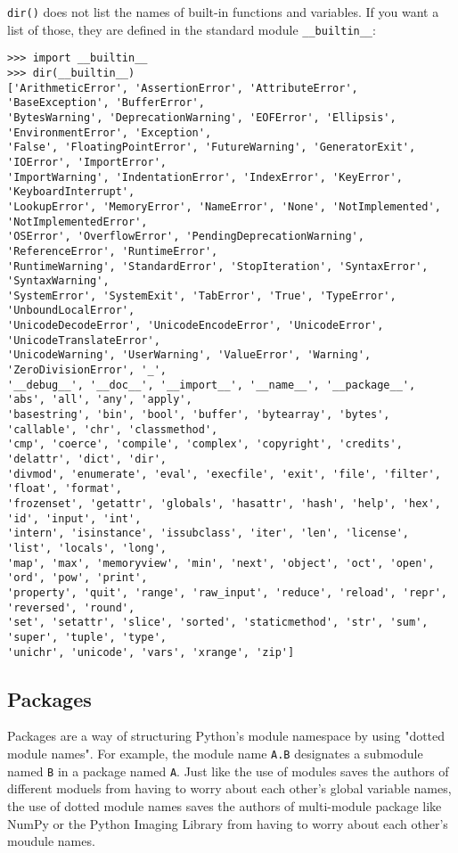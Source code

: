 \documentclass[UTF8]{article}
\begin{document}
\texttt{dir()} does not list the names of built-in functions and variables. If you want a list of
those, they are defined in the standard module \texttt{\_\_builtin\_\_}:
\begin{verbatim}
>>> import __builtin__
>>> dir(__builtin__)
['ArithmeticError', 'AssertionError', 'AttributeError', 'BaseException', 'BufferError',
'BytesWarning', 'DeprecationWarning', 'EOFError', 'Ellipsis', 'EnvironmentError', 'Exception',
'False', 'FloatingPointError', 'FutureWarning', 'GeneratorExit', 'IOError', 'ImportError',
'ImportWarning', 'IndentationError', 'IndexError', 'KeyError', 'KeyboardInterrupt',
'LookupError', 'MemoryError', 'NameError', 'None', 'NotImplemented', 'NotImplementedError',
'OSError', 'OverflowError', 'PendingDeprecationWarning', 'ReferenceError', 'RuntimeError',
'RuntimeWarning', 'StandardError', 'StopIteration', 'SyntaxError', 'SyntaxWarning',
'SystemError', 'SystemExit', 'TabError', 'True', 'TypeError', 'UnboundLocalError',
'UnicodeDecodeError', 'UnicodeEncodeError', 'UnicodeError', 'UnicodeTranslateError',
'UnicodeWarning', 'UserWarning', 'ValueError', 'Warning', 'ZeroDivisionError', '_',
'__debug__', '__doc__', '__import__', '__name__', '__package__', 'abs', 'all', 'any', 'apply',
'basestring', 'bin', 'bool', 'buffer', 'bytearray', 'bytes', 'callable', 'chr', 'classmethod',
'cmp', 'coerce', 'compile', 'complex', 'copyright', 'credits', 'delattr', 'dict', 'dir',
'divmod', 'enumerate', 'eval', 'execfile', 'exit', 'file', 'filter', 'float', 'format',
'frozenset', 'getattr', 'globals', 'hasattr', 'hash', 'help', 'hex', 'id', 'input', 'int',
'intern', 'isinstance', 'issubclass', 'iter', 'len', 'license', 'list', 'locals', 'long',
'map', 'max', 'memoryview', 'min', 'next', 'object', 'oct', 'open', 'ord', 'pow', 'print',
'property', 'quit', 'range', 'raw_input', 'reduce', 'reload', 'repr', 'reversed', 'round',
'set', 'setattr', 'slice', 'sorted', 'staticmethod', 'str', 'sum', 'super', 'tuple', 'type',
'unichr', 'unicode', 'vars', 'xrange', 'zip']
\end{verbatim}

\subsection{Packages}
Packages are a way of structuring Python's module namespace by using "dotted module names". For
example, the module name \texttt{A.B} designates a submodule named \texttt{B} in a package named
\texttt{A}. Just like the use of modules saves the authors of different moduels from having to
worry about each other's global variable names, the use of dotted module names saves the authors of
multi-module package like NumPy or the Python Imaging Library from having to worry about each
other's moudule names.
\end{document}
